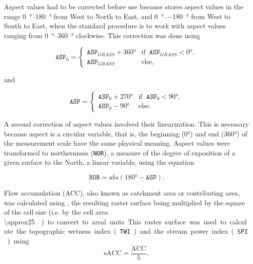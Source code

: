 Aspect values had to be corrected before use because  stores aspect values in the range 
\SIrange{0}{+180}{\degree} from West to North to East, and \SIrange{0}{-180}{\degree} from West to South to 
East, when the standard procedure is to work with aspect values ranging from \SIrange{0}{360}{\degree} 
clockwise. This correction was done using

\begin{equation}
 \texttt{ASP}_{0} =
 \begin{cases}
  \texttt{ASP}_{GRASS} + \ang{360} & \text{if}\;\; \texttt{ASP}_{GRASS} < \ang{0}, \\
  \texttt{ASP}_{GRASS}             & \text{else},
 \end{cases}
\end{equation}

\noindent and

\begin{equation}
 \texttt{ASP} =
 \begin{cases}
  \texttt{ASP}_{0} + \ang{270} & \text{if}\;\; \texttt{ASP}_{0} < \ang{90}, \\
  \texttt{ASP}_{0} - \ang{90}  & \text{else}.
 \end{cases}
\end{equation}

\noindent A second correction of aspect values involved their linearization. This is necessary because aspect 
is a circular variable, that is, the beginning (\ang{0}) and end (\ang{360}) of the measurement scale have the 
same physical meaning. Aspect values were transformed to northernness (\texttt{NOR}), a measure of the degree 
of exposition of a given surface to the North, a linear variable, using the equation

\begin{equation}
 \texttt{NOR} = abs(\ang{180} - \texttt{ASP}).
\end{equation}\label{eq:NOR}  

Flow accumulation (ACC), also known as catchment area or contributing area, was calculated using 
, the resulting raster surface being multiplied by the square of the cell size (i.e. by the 
cell area \SI{\approx25}{\metre\square}) to convert to areal units. This raster surface was used to calculate 
the topographic wetness index (\texttt{TWI}) and the stream power index (\texttt{SPI}) using

\begin{equation}
 \text{sACC} = \dfrac{\text{ACC}}{5},
\end{equation}\label{eq:sACC}

